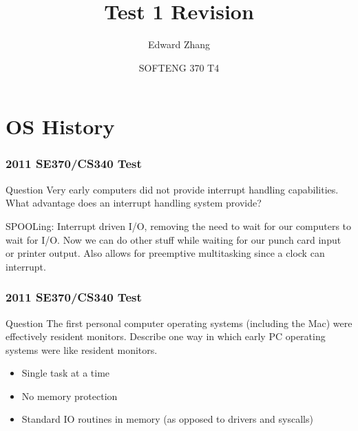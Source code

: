 \documentclass{beamer}
\title[SOFTENG 370 Tutorial 4 (2019)] %
{Test 1 Revision}
\author{Edward Zhang}
\date[August 2019] %
{SOFTENG 370 T4}
\begin{document}
\frame{\titlepage}
\section{OS History}
\begin{frame}
  \frametitle{2011 SE370/CS340 Test}
  \begin{block}{Question}
    Very early computers did not provide interrupt handling capabilities. What advantage does an interrupt handling system provide?
  \end{block}
  \pause
  SPOOLing: Interrupt driven I/O, removing the need to wait for our computers to wait for I/O. Now we can do other stuff while waiting for our punch card input or printer output. Also allows for preemptive multitasking since a clock can interrupt.
\end{frame}
\begin{frame}
  \frametitle{2011 SE370/CS340 Test}
  \begin{block}{Question}
    The first personal computer operating systems (including the Mac) were effectively resident monitors. Describe one way in which early PC operating systems were like resident monitors.
  \end{block}
  \pause
  \begin{itemize}
    \item Single task at a time
    \item No memory protection
    \item Standard IO routines in memory (as opposed to drivers and syscalls)
  \end{itemize}
\end{frame}
\end{document}
